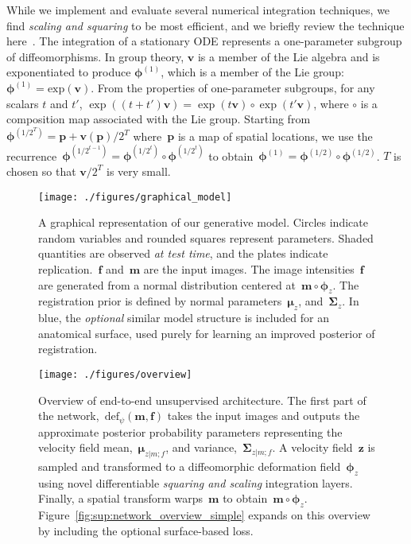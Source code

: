 \documentclass{article}
\newcommand{\bp}{\boldsymbol{p}}
\newcommand{\bmu}{\boldsymbol{\mu}}
\newcommand{\bphi}{\boldsymbol{\phi}}
\newcommand{\bSigma}{\boldsymbol{\Sigma}}
\newcommand{\bz}{\boldsymbol{z}}
\newcommand{\bv}{\boldsymbol{v}}
\newcommand{\bmoving}{\boldsymbol{m}}
\newcommand{\bfixed}{\boldsymbol{f}}
\newcommand{\moving}{m}
\newcommand{\fixed}{f}
\newcommand{\citep}{\cite}
\begin{document}
While we implement and evaluate several numerical integration techniques, we find \textit{scaling and squaring} to be most efficient, and we briefly review the technique here~\citep{arsigny2006}.
The integration of a stationary ODE represents a one-parameter subgroup of diffeomorphisms.  In group theory, $\bv$ is a member of the Lie algebra and is exponentiated to produce $\bphi^{(1)}$, which is a member of the Lie group: $\bphi^{(1)} =\text{exp}(\bv)$.
  From the properties of one-parameter subgroups, for any scalars $t$ and $t'$, \mbox{$\exp((t+t')\bv) = \exp(t\bv) \circ \exp(t'\bv)$}, where $\circ$ is a composition map associated with the Lie group. Starting from~$\bphi^{(1/2^T)} =\bp + \bv(\bp)/2^T$ where~$\bp$ is a map of spatial locations, we use the recurrence~$\bphi^{(1/2^{t-1})} = \bphi^{(1/2^t)} \circ \bphi^{(1/2^t)}$ to obtain~$\bphi^{(1)} = \bphi^{(1/2)} \circ \bphi^{(1/2)}$. $T$ is chosen so that $\bv/2^T$ is very small.









\begin{figure}[t!]
	\centering
		\texttt{[image: ./figures/graphical\_model]}
\caption{A graphical representation of our generative model. Circles indicate random variables and rounded squares represent parameters. Shaded quantities are observed \textit{at test time}, and the plates indicate replication.~$\bfixed$ and~$\bmoving$ are the input images. The image intensities~$\bfixed$ are generated from a normal distribution centered at~$\bmoving \circ \bphi_z$. The registration prior is defined by normal parameters~$\bmu_{z}$, and~$\bSigma_{z}$. In blue, the \textit{optional} similar model structure is included for an anatomical surface, used purely for learning an improved posterior of registration.}
	\label{fig:graphicalmodel_simple}
\end{figure}

\begin{figure*}[t!]
	\centering
	\begin{center}
	  \texttt{[image: ./figures/overview]}
	\end{center}
	\hfill
	\begin{minipage}[b]{1\linewidth}
		\caption{Overview of end-to-end unsupervised architecture. The first part of the network,~$\text{def}_{\psi}(\bmoving, \bfixed)$ takes the input images and outputs the approximate posterior probability parameters representing the velocity field mean,~$\bmu_{z|\moving;\fixed}$, and variance,~$\bSigma_{z|\moving;\fixed}$. A velocity field~$\bz$ is sampled and transformed to a diffeomorphic deformation field~$\bphi_z$ using novel differentiable \textit{squaring and scaling} integration layers. Finally, a spatial transform warps~$\bmoving$ to obtain~$\bmoving \circ \bphi_z$. Figure~\ref{fig:sup:network_overview_simple} expands on this overview by including the optional surface-based loss.
		}
		\label{fig:network_overview_simple}
	\end{minipage}
\end{figure*}
\end{document}
